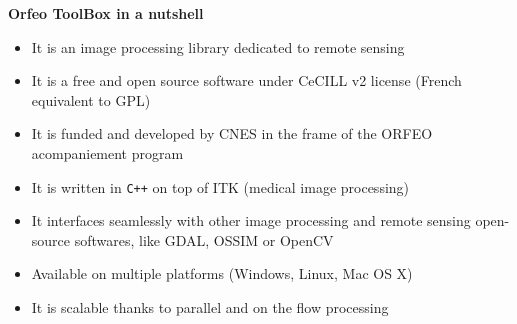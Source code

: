 \documentclass[portrait,a0]{a0poster}
\newenvironment{poster}{
  \begin{center}
  \begin{minipage}[c]{0.99\textwidth}
}{
  \end{minipage} 
  \end{center}
}
\newcommand{\titresection}[1]{ 
 	\begin{center}
 	\huge \textbf{\color{c2}{#1}}
 	
 	

 	
 	\end{center}
 }
\newcommand{\titresubsection}[1]{ 
 	\begin{center}
 	\Large{\textbf{#1}}
 	\end{center}
 }
\begin{document}
\begin{poster}
\vspace{1cm}



\begin{minipage}[t]{\textwidth}
\titresection{\sc What is Orfeo ToolBox ?}
\vspace{0.5cm}
\begin{minipage}[t]{0.3\textwidth}
\titresubsection{Orfeo ToolBox in a nutshell}
\Large{
\begin{itemize}
\item It is an image processing library dedicated to remote sensing
\item It is a free and open source software under CeCILL v2 license (French equivalent
  to GPL)
\item It is funded and developed by CNES in the frame of the ORFEO acompaniement program
\item It is written in \verb!C++! on top of ITK (medical image processing)
\item It interfaces seamlessly with other image processing and remote
  sensing open-source softwares, like GDAL, OSSIM or OpenCV
\item Available on multiple platforms (Windows, Linux, Mac OS X)
\item It is scalable thanks to parallel and on the flow processing
\end{itemize}

}
\end{minipage}
\end{minipage}
\end{poster}
\end{document}
